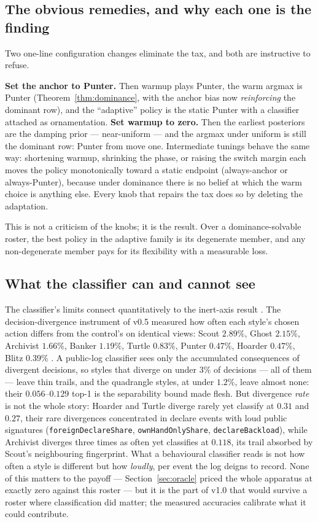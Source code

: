 \documentclass[11pt]{article}
\newcommand{\code}[1]{\texttt{#1}}
\begin{document}
\subsection{The obvious remedies, and why each one is the finding}
\label{sec:remedies}

Two one-line configuration changes eliminate the tax, and both are instructive to refuse.

\textbf{Set the anchor to Punter.} Then warmup plays Punter, the warm argmax is Punter
(Theorem~\ref{thm:dominance}, with the anchor bias now \emph{reinforcing} the dominant
row), and the ``adaptive'' policy is the static Punter with a classifier attached as
ornamentation. \textbf{Set warmup to zero.} Then the earliest posteriors are the damping
prior --- near-uniform --- and the argmax under uniform is still the dominant row: Punter
from move one. Intermediate tunings behave the same way: shortening warmup, shrinking the
phase, or raising the switch margin each moves the policy monotonically toward a static
endpoint (always-anchor or always-Punter), because under dominance there is no belief at
which the warm choice is anything else. Every knob that repairs the tax does so by
deleting the adaptation.

This is not a criticism of the knobs; it is the result. Over a dominance-solvable roster,
the best policy in the adaptive family is its degenerate member, and any non-degenerate
member pays for its flexibility with a measurable loss.

\subsection{What the classifier can and cannot see}
\label{sec:clslimits}

The classifier's limits connect quantitatively to the inert-axis result
\cite{inertpaper}. The decision-divergence instrument of v0.5 measured how often each
style's chosen action differs from the control's on identical views: Scout $2.89\%$,
Ghost $2.15\%$, Archivist $1.66\%$, Banker $1.19\%$, Turtle $0.83\%$, Punter $0.47\%$,
Hoarder $0.47\%$, Blitz $0.39\%$ \cite{styles}. A public-log classifier sees only the
accumulated consequences of divergent decisions, so styles that diverge on under $3\%$ of
decisions --- all of them --- leave thin trails, and the quadrangle styles, at under
$1.2\%$, leave almost none: their $0.056$--$0.129$ top-1 is the separability bound made
flesh. But divergence \emph{rate} is not the whole story: Hoarder and Turtle diverge
rarely yet classify at $0.31$ and $0.27$, their rare divergences concentrated in declare
events with loud public signatures (\code{foreignDeclareShare}, \code{ownHandOnlyShare},
\code{declareBackload}), while Archivist diverges three times as often yet classifies at
$0.118$, its trail absorbed by Scout's neighbouring fingerprint. What a behavioural
classifier reads is not how often a style is different but how \emph{loudly}, per event
the log deigns to record. None of this matters to the payoff ---
Section~\ref{sec:oracle} priced the whole apparatus at exactly zero against this roster
--- but it is the part of v1.0 that would survive a roster where classification did
matter; the measured accuracies calibrate what it could contribute.
\end{document}
